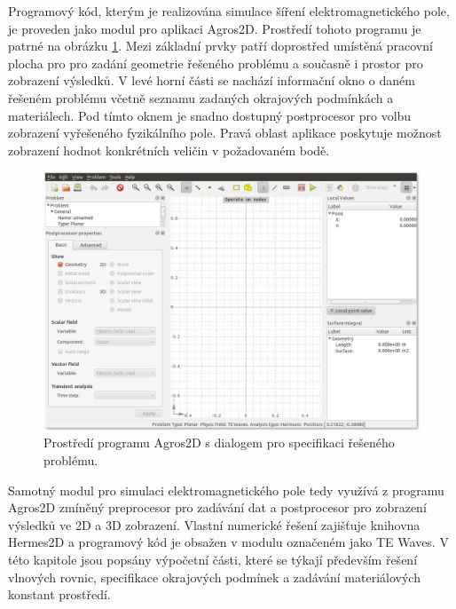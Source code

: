 Programový kód, kterým je realizována simulace šíření elektromagnetického pole, je proveden jako modul pro aplikaci Agros2D. Prostředí tohoto programu je patrné na obrázku \ref{obr:sim_agros2d}. Mezi základní prvky patří doprostřed umístěná pracovní plocha pro pro zadání geometrie řešeného problému a současně i prostor pro zobrazení výsledků. V levé horní části se nachází informační okno o daném řešeném problému včetně seznamu zadaných okrajových podmínkách a materiálech. Pod tímto oknem je snadno dostupný postprocesor pro volbu zobrazení vyřešeného fyzikálního pole. Pravá oblast aplikace poskytuje možnost zobrazení hodnot konkrétních veličin v požadovaném bodě.

\begin{figure}[!h]
	\centering
	\includegraphics[width=14cm]{sim_agros2d.png}
	\caption{Prostředí programu Agros2D s dialogem pro specifikaci řešeného problému.}
	\label{obr:sim_agros2d}
\end{figure}

Samotný modul pro simulaci elektromagnetického pole tedy využívá z programu Agros2D zmíněný preprocesor pro zadávání dat a postprocesor pro zobrazení výsledků ve 2D a 3D zobrazení. Vlastní numerické řešení zajišťuje knihovna Hermes2D a programový kód je obsažen v modulu  označeném jako TE Waves. V této kapitole jsou popsány výpočetní části, které se týkají především řešení vlnových rovnic, specifikace okrajových podmínek a zadávání materiálových konstant prostředí. 

